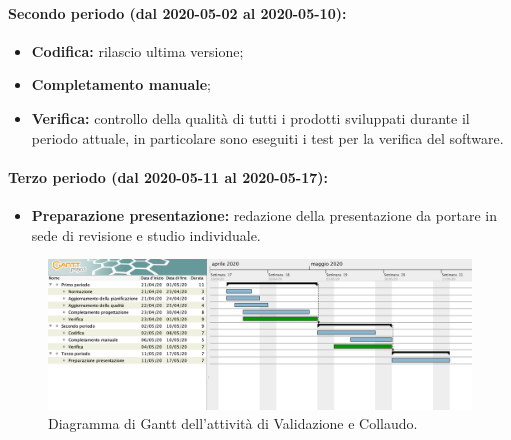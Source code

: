 				\paragraph{Secondo periodo (dal 2020-05-02 al 2020-05-10):}
				
					\begin{itemize}
						\item \textbf{Codifica:} rilascio ultima versione;
						\item \textbf{Completamento manuale};
						\item \textbf{Verifica:} controllo della qualità di tutti i prodotti sviluppati durante il periodo attuale, in particolare sono eseguiti i test per la verifica del software.
					\end{itemize}
		
				\paragraph{Terzo periodo (dal 2020-05-11 al 2020-05-17):}
				
					\begin{itemize}
						\item \textbf{Preparazione presentazione:} redazione della presentazione da portare in sede di revisione e studio individuale.
					\end{itemize}
			
		\begin{landscape}

          \begin{figure}[H]
            \centering
            \includegraphics[width=\linewidth]{images/ganttValidazioneColl}
            \caption{Diagramma di Gantt dell'attività di Validazione e Collaudo.}
          \end{figure}

		\end{landscape}
